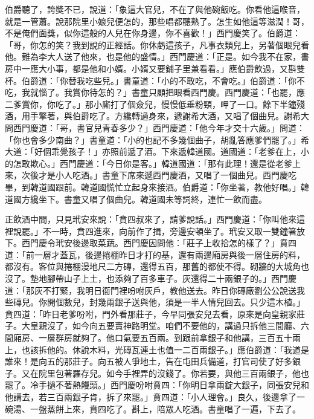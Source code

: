 伯爵聽了，誇獎不已，說道：「象這大官兒，不在了與他碗飯吃。你看他這喉音，就是一管蕭。說那院里小娘兒便怎的，那些唱都聽熟了。怎生如他這等滋潤！哥，不是俺們面獎，似你這般的人兒在你身邊，你不喜歡！」西門慶笑了。伯爵道：「哥，你怎的笑？我到說的正經話。你休虧這孩子，凡事衣類兒上，另著個眼兒看他。難為李大人送了他來，也是他的盛情。」西門慶道：「正是。如今我不在家，書房中一應大小事，都是他和小婿。小婿又要鋪子里兼看看。」應伯爵飲過，又斟雙杯。伯爵道：「你替我吃些兒。」書童道：「小的不敢吃，不會吃。」伯爵道：「你不吃，我就惱了。我賞你待怎的？」書童只顧把眼看西門慶。西門慶道：「也罷，應二爹賞你，你吃了。」那小廝打了個僉兒，慢慢低垂粉頸，呷了一口。餘下半鐘殘酒，用手擎著，與伯爵吃了。方纔轉過身來，遞謝希大酒，又唱了個曲兒。謝希大問西門慶道：「哥，書官兒青春多少？」西門慶道：「他今年才交十六歲。」問道：「你也會多少南曲？」書童道：「小的也記不多幾個曲子，胡亂答應爹們罷了。」希大道：「好個乖覺孩子！」亦照前遞了酒。下來遞韓道國。道國道：「老爹在上，小的怎敢欺心。」西門慶道：「今日你是客。」韓道國道：「那有此理！還是從老爹上來，次後才是小人吃酒。」書童下席來遞西門慶酒，又唱了一個曲兒。西門慶吃畢，到韓道國跟前。韓道國慌忙立起身來接酒。伯爵道：「你坐著，教他好唱。」韓道國方纔坐下。書童又唱了個曲兒。韓道國未等詞終，連忙一飲而盡。

正飲酒中間，只見玳安來說：「賁四叔來了，請爹說話。」西門慶道：「你叫他來這裡說罷。」不一時，賁四進來，向前作了揖，旁邊安頓坐了。玳安又取一雙鐘箸放下。西門慶令玳安後邊取菜蔬。西門慶因問他：「莊子上收拾怎的樣了？」賁四道：「前一層才蓋瓦，後邊捲棚昨日才打的基，還有兩邊廂房與後一層住房的料，都沒有。客位與捲棚漫地尺二方磚，還得五百，那舊的都使不得。砌牆的大城角也沒了。墊地腳帶山子上土，也添夠了百多車子。灰還得二十兩銀子的。」西門慶道：「那灰不打緊，我明日衙門裡吩咐灰戶，教他送去。昨日你磚廠劉公公說送我些磚兒。你開個數兒，封幾兩銀子送與他，須是一半人情兒回去。只少這木植。」賁四道：「昨日老爹吩咐，門外看那莊子，今早同張安兒去看，原來是向皇親家莊子。大皇親沒了，如今向五要賣神路明堂。咱們不要他的，講過只拆他三間廳、六間廂房、一層群房就夠了。他口氣要五百兩。到跟前拿銀子和他講，三百五十兩上，也該拆他的。休說木料，光磚瓦連土也值一二百兩銀子。」應伯爵道：「我道是誰來！是向五的那莊子。向五被人爭地土，告在屯田兵備道，打官司使了好多銀子。又在院里包著羅存兒。如今手裡弄的沒錢了。你若要，與他三百兩銀子，他也罷了。冷手撾不著熱饅頭。」西門慶吩咐賁四：「你明日拿兩錠大銀子，同張安兒和他講去，若三百兩銀子肯，拆了來罷。」賁四道：「小人理會。」良久，後邊拿了一碗湯、一盤蒸餅上來，賁四吃了。斟上，陪眾人吃酒。書童唱了一遍，下去了。

